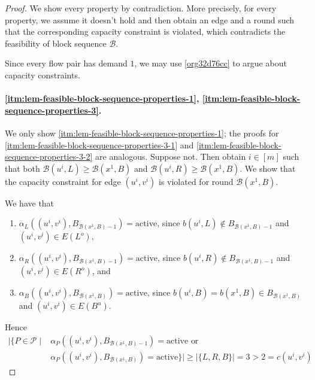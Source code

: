 \documentclass[fontsize=11pt,paper=a4]{book}
\begin{document}
\begin{proof}
We show every property by contradiction.
More precisely, for every property, we assume it doesn't hold and then obtain an edge and a round such that the corresponding capacity constraint is violated, which contradicts the feasibility of block sequence \(\mathcal{B}\).

Since every flow pair has demand \(1\), we may use \ref{org32d76cc} to argue about capacity constraints.

\paragraph{\ref{itm:lem-feasible-block-sequence-properties-1}, \ref{itm:lem-feasible-block-sequence-properties-3}.}
We only show \ref{itm:lem-feasible-block-sequence-properties-1}; the proofs for \ref{itm:lem-feasible-block-sequence-properties-3-1} and \ref{itm:lem-feasible-block-sequence-properties-3-2} are analogous.
Suppose not.
Then obtain \(i\in[m]\) such that both \(\mathcal{B}(u^i,L)\geq\mathcal{B}(x^1,B)\) and \(\mathcal{B}(u^i,R)\geq\mathcal{B}(x^1,B)\).
We show that the capacity constraint for edge \((u^i,v^i)\) is violated for round \(\mathcal{B}(x^1,B)\).

We have that

\begin{enumerate}
\item \(\alpha_L((u^i,v^i),B_{\mathcal{B}(x^1,B)-1})=\mathrm{active}\), since \(b(u^i,L)\notin B_{\mathcal{B}(x^1,B)-1}\) and \((u^i,v^i)\in E(L^o)\),

\item \(\alpha_R((u^i,v^i),B_{\mathcal{B}(x^1,B)-1})=\mathrm{active}\), since \(b(u^i,R)\notin B_{\mathcal{B}(x^1,B)-1}\) and \((u^i,v^i)\in E(R^o)\), and

\item \(\alpha_B((u^i,v^i),B_{\mathcal{B}(x^1,B)})=\mathrm{active}\), since \(b(u^i,B)=b(x^1,B)\in B_{\mathcal{B}(x^1,B)}\) and \((u^i,v^i)\in E(B^u)\).
\end{enumerate}

Hence
\begin{align*}
\lvert\{P\in\mathcal{P}\mid&\alpha_P((u^i,v^i),B_{\mathcal{B}(x^1,B)-1})=\mathrm{active}\text{ or }\\
&\alpha_P((u^i,v^i),B_{\mathcal{B}(x^1,B)})=\mathrm{active}\}\rvert\geq\lvert\{L,R,B\}\rvert=3>2=c(u^i,v^i)
\end{align*}


\end{proof}
\end{document}

